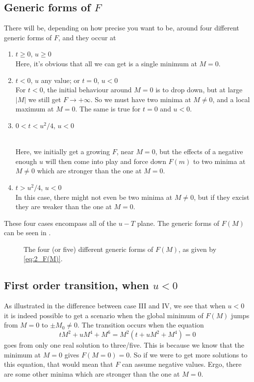 \documentclass[11pt,letter, swedish, english
]{article}
\begin{document}
\subsection{Generic forms of $F$}
There will be, depending on how precise you want to be, around four
different generic forms of $F$, and they occur at
\begin{enumerate}[label=\Roman*.]
\item $t\ge0$, $u\ge0$ \\
Here, it's obvious that all we can get is a single minimum at $M=0$.
\item $t<0$, $u$ any value; or $t=0$, $u<0$\\
For $t<0$, the initial behaviour around $M=0$ is to drop down, but at
large $|M|$ we still get $F\to+\infty$. So we must have two minima at
$M\neq0$, and a local maximum at $M=0$. The same is true for $t=0$ and
$u<0$. 
\item $0<t<u^2/4$, $u<0$\footnotemark{}\addtocounter{footnote}{-1}\\
Here, we initially get a growing $F$, near $M=0$, but the effects of a
negative enough $u$ will then come into play and force down $F(m)$ to
two minima at $M\neq0$ which are stronger than the one at $M=0$.
\item $t>u^2/4$, $u<0$\footnotemark{}\\
In this case, there might not even be two minima at $M\neq0$, but if
they excist they are weaker than the one at $M=0$.
\end{enumerate}
These four cases encompass all of the $u{-}T$ plane. The generic forms
of $F(M)$ can be seen in .


\begin{figure}
\centering

\caption{The four (or five) different generic forms of $F(M)$, as
  given by \eqref{eq:2_F(M)}. }
\label{fig:2a}
\end{figure}

\subsection{First order transition, when $u<0$}
As illustrated in the difference between case III and IV, we see that
when $u<0$ it is indeed possible to get a scenario when the global
minimum of $F(M)$ jumps from $M=0$ to $\pm M_0\neq0$. The transition
occurs when the equation 
\begin{equation}
tM^2+uM^4+M^6=M^2(t+uM^2+M^4)=0
\end{equation}
goes from only one real solution to three/five. This is because we
know that the minimum at $M=0$ gives $F(M=0)=0$. So if we were to get
more solutions to this equation, that would mean that $F$ can assume
negative values. Ergo, there are some other minima which are stronger
than the one at $M=0$. 
\end{document}

